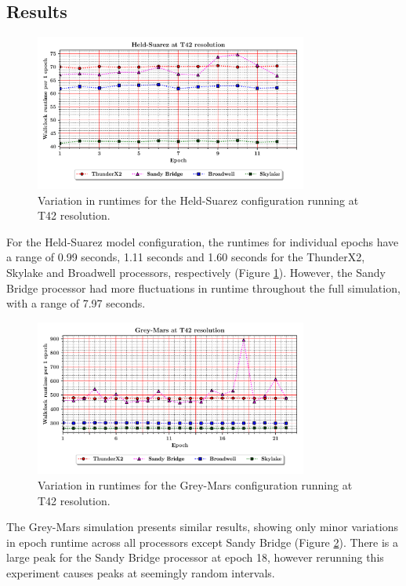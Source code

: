 \documentclass[a4paper,11pt]{report}
\begin{document}
\subsection{Results}
\begin{figure}[htbp]
\begin{center}
\includegraphics[width=0.8\textwidth]{img/held_suarez-variation.pdf}
\caption{Variation in runtimes for the Held-Suarez configuration running at T42 resolution.}
\label{fig:variation-comparison-held-t42}
\end{center}
\end{figure}
For the Held-Suarez model configuration, the runtimes for individual epochs have a range of 0.99 seconds, 1.11 seconds and 1.60 seconds for the ThunderX2, Skylake and Broadwell processors, respectively (Figure \ref{fig:variation-comparison-held-t42}). However, the Sandy Bridge processor had more fluctuations in runtime throughout the full simulation, with a range of 7.97 seconds.
\begin{figure}[htbp]
\begin{center}
\includegraphics[width=0.8\textwidth]{img/grey_mars-variation.pdf}
\caption{Variation in runtimes for the Grey-Mars configuration running at T42 resolution.}
\label{fig:variation-comparison-mars-t42}
\end{center}
\end{figure}
\par
The Grey-Mars simulation presents similar results, showing only minor variations in epoch runtime across all processors except Sandy Bridge (Figure \ref{fig:variation-comparison-mars-t42}). There is a large peak for the Sandy Bridge processor at epoch 18, however rerunning this experiment causes peaks at seemingly random intervals.
\end{document}

